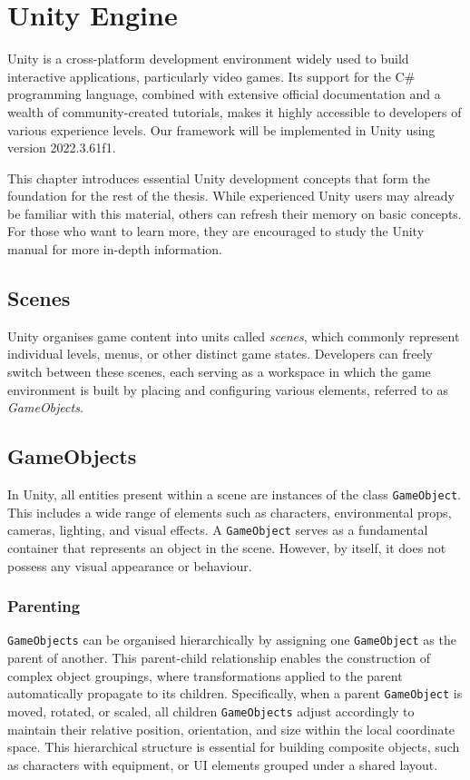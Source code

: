 \chapter{Unity Engine}
\label{chap:refs}
Unity is a cross-platform development environment widely used to build interactive applications, particularly video games. Its support for the C\# programming language, combined with extensive official documentation and a wealth of community-created tutorials, makes it highly accessible to developers of various experience levels. Our framework will be implemented in Unity using version 2022.3.61f1. 

This chapter introduces essential Unity development concepts that form the foundation for the rest of the thesis. While experienced Unity users may already be familiar with this material, others can refresh their memory on basic concepts. For those who want to learn more, they are encouraged to study the Unity manual \cite{Unity-manual} for more in-depth information. 

\section{Scenes}
Unity organises game content into units called \textit{scenes}, which commonly represent individual levels, menus, or other distinct game states. Developers can freely switch between these scenes, each serving as a workspace in which the game environment is built by placing and configuring various elements, referred to as \textit{GameObjects}. 

\section{GameObjects}
In Unity, all entities present within a scene are instances of the class \verb|GameObject|. This includes a wide range of elements such as characters, environmental props, cameras, lighting, and visual effects. A \verb|GameObject| serves as a fundamental container that represents an object in the scene. However, by itself, it does not possess any visual appearance or behaviour.

\subsection{Parenting}
\verb|GameObjects| can be organised hierarchically by assigning one \verb|GameObject| as the parent of another. This parent-child relationship enables the construction of complex object groupings, where transformations applied to the parent automatically propagate to its children. Specifically, when a parent \verb|GameObject| is moved, rotated, or scaled, all children \verb|GameObjects| adjust accordingly to maintain their relative position, orientation, and size within the local coordinate space. This hierarchical structure is essential for building composite objects, such as characters with equipment, or UI elements grouped under a shared layout. 

